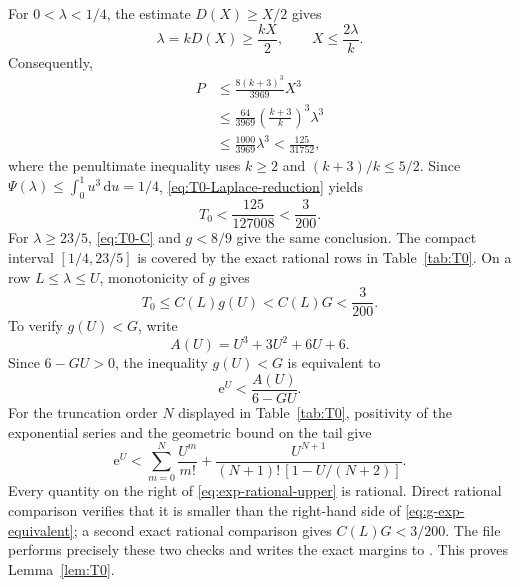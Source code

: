 \documentclass[11pt]{amsart}
\theoremstyle{definition}
\newcommand{\dd}{\,\mathrm d}
\newcommand{\e}{\mathrm e}
\begin{document}
For $0<\lambda<1/4$, the estimate $D(X)\ge X/2$ gives
\[
 \lambda=kD(X)\ge\frac{kX}{2},
 \qquad
 X\le\frac{2\lambda}{k}.
\]
Consequently,
\begin{align*}
 P
 &\le\frac{8(k+3)^3}{3969}X^3\\
 &\le\frac{64}{3969}
    \left(\frac{k+3}{k}\right)^3\lambda^3\\
 &\le\frac{1000}{3969}\lambda^3
 <\frac{125}{31752},
\end{align*}
where the penultimate inequality uses $k\ge2$ and $(k+3)/k\le5/2$.  Since $\Psi(\lambda)\le\int_0^1u^3\dd u=1/4$, \eqref{eq:T0-Laplace-reduction} yields
\[
 T_0<\frac{125}{127008}<\frac3{200}.
\]
For $\lambda\ge23/5$, \eqref{eq:T0-C} and $g<8/9$ give the same conclusion.  The compact interval $[1/4,23/5]$ is covered by the exact rational rows in Table~\ref{tab:T0}.  On a row $L\le\lambda\le U$, monotonicity of $g$ gives
\[
 T_0\le C(L)g(U)<C(L)G<\frac3{200}.
\]
To verify $g(U)<G$, write
\[
 A(U)=U^3+3U^2+6U+6.
\]
Since $6-GU>0$, the inequality $g(U)<G$ is equivalent to
\begin{equation}\label{eq:g-exp-equivalent}
 \e^U<\frac{A(U)}{6-GU}.
\end{equation}
For the truncation order $N$ displayed in Table~\ref{tab:T0}, positivity of the exponential series and the geometric bound on the tail give
\begin{equation}\label{eq:exp-rational-upper}
 \e^U
 <\sum_{m=0}^{N}\frac{U^m}{m!}
 +\frac{U^{N+1}}{(N+1)!\,[1-U/(N+2)]}.
\end{equation}
Every quantity on the right of \eqref{eq:exp-rational-upper} is rational.  Direct rational comparison verifies that it is smaller than the right-hand side of \eqref{eq:g-exp-equivalent}; a second exact rational comparison gives $C(L)G<3/200$.  The file  performs precisely these two checks and writes the exact margins to .  This proves Lemma~\ref{lem:T0}.
\end{document}
